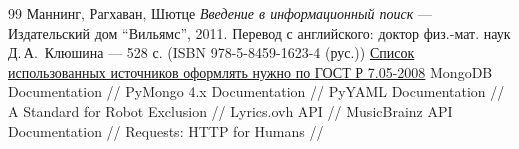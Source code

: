 \begin{thebibliography}{99}
Маннинг, Рагхаван, Шютце
{\itshape Введение в информационный поиск} --- Издательский дом \enquote{Вильямс}, 2011. Перевод с английского: доктор физ.-мат. наук Д.\,А.\, Клюшина --- 528 с. (ISBN 978-5-8459-1623-4 (рус.))
\href{http://www.ifap.ru/library/gost/7052008.pdf}{Список использованных источников оформлять нужно по  ГОСТ Р 7.05-2008}
MongoDB Documentation // 
PyMongo 4.x Documentation // 
PyYAML Documentation // 
A Standard for Robot Exclusion // 
Lyrics.ovh API // 
MusicBrainz API Documentation // 
Requests: HTTP for Humans // 
\end{thebibliography}
\pagebreak

